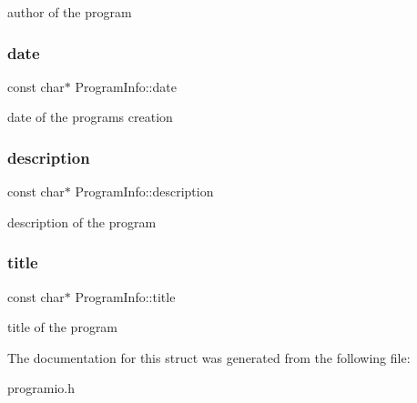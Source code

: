 author of the program \mbox{\label{structProgramInfo_abfdfeeffcae75443aff7f057d533a678}} 
\subsubsection{\texorpdfstring{date}{date}}
{\footnotesize\ttfamily const char$\ast$ Program\+Info\+::date}

date of the program\textquotesingle{}s creation \mbox{\label{structProgramInfo_a036dc2e0c0bc90d7d28ca8c41b08b36f}} 
\subsubsection{\texorpdfstring{description}{description}}
{\footnotesize\ttfamily const char$\ast$ Program\+Info\+::description}

description of the program \mbox{\label{structProgramInfo_aaf3f9430d23c98fce1627ec0bd052e13}} 
\subsubsection{\texorpdfstring{title}{title}}
{\footnotesize\ttfamily const char$\ast$ Program\+Info\+::title}

title of the program 

The documentation for this struct was generated from the following file\+:\begin{DoxyCompactItemize}
\item 
programio.\+h\end{DoxyCompactItemize}

